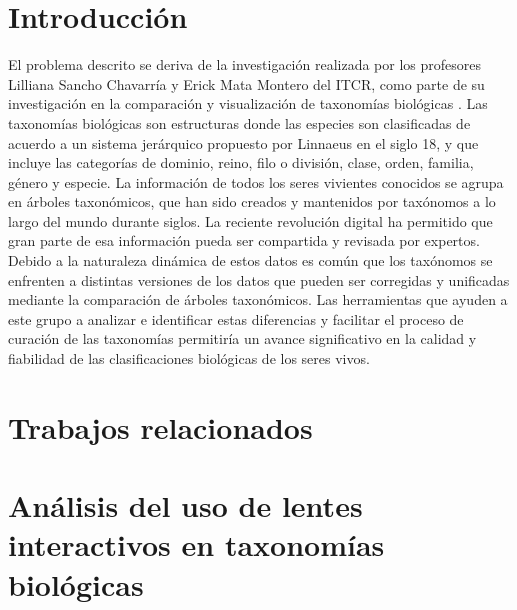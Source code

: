 \documentclass[journal]{IEEEtran}
\begin{document}
\section{Introducción}
% 
% 
% 
% 
El problema descrito se deriva de la investigación realizada por los profesores Lilliana 
Sancho Chavarría y Erick Mata Montero del ITCR, como parte  de su  investigación en la comparación
y visualización de taxonomías biológicas \cite{sancho_diafora}.
Las taxonomías biológicas son estructuras donde las especies son clasificadas de
 acuerdo a un sistema jerárquico propuesto por Linnaeus en el siglo 18\cite{linne},
  y que incluye las categorías de dominio, reino, filo o división, clase, orden,
   familia, género y especie.
La información de todos los seres vivientes conocidos se agrupa en
 árboles taxonómicos, que han sido creados y mantenidos por taxónomos a lo largo 
 del mundo durante siglos. La reciente revolución digital ha permitido que gran parte 
 de esa información pueda  ser compartida y revisada por expertos.  
 Debido a la naturaleza dinámica de estos datos es común que los taxónomos se 
 enfrenten a distintas versiones de los datos que pueden ser corregidas y unificadas
  mediante la comparación de árboles taxonómicos. Las herramientas que ayuden a este 
  grupo a analizar e identificar estas diferencias y facilitar el proceso de curación 
  de las taxonomías permitiría un avance significativo en la calidad y fiabilidad de
   las clasificaciones biológicas de los seres vivos.
\section{Trabajos relacionados}
\section{Análisis del uso de lentes interactivos en taxonomías biológicas}
\end{document}
